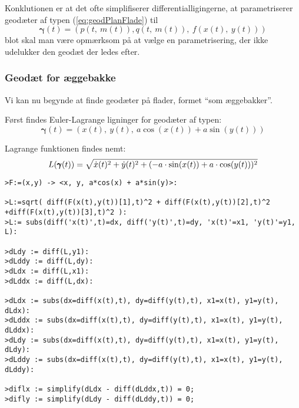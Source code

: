 Konklutionen er at det ofte simplifiserer differentialligingerne,
at parametriserer geodæter af typen (\ref{eq:geodPlanFlade}) til
\begin{equation*}
\pmb{\gamma}(t) = (p(t,~m(t)),q(t,~m(t)),~f(x(t),~y(t)))
\end{equation*}
blot skal man være opmærksom på at vælge en parametrisering, der ikke udelukker den geodæt der ledes efter.

\subsubsection{Geodæt for æggebakke }

Vi kan nu begynde at finde geodæter på flader, formet ``som æggebakker''.

Først findes Euler-Lagrange ligninger for geodæter af typen:
\begin{equation}\label{eq:aeggegeo}
\pmb{\gamma}(t) = (x(t),~y(t),~a\cos(x(t)) + a\sin(y(t)))
\end{equation}

Lagrange funktionen findes nemt:
\begin{equation*}
L(\pmb{\gamma}(t)) = \sqrt{\dot{x}(t)^2 + \dot{y}(t)^2 + ( -a \cdot \sin(x(t)) + a \cdot \cos(y(t)) )^2}
\end{equation*}
 
\begin{lstlisting}[caption=Udregning af de to Lagrange ligninger til (\ref{eq:aeggegeo}) med \emph{Maple}  ]
>F:=(x,y) -> <x, y, a*cos(x) + a*sin(y)>:

>L:=sqrt( diff(F(x(t),y(t))[1],t)^2 + diff(F(x(t),y(t))[2],t)^2 +diff(F(x(t),y(t))[3],t)^2 ):
>L:= subs(diff('x(t)',t)=dx, diff('y(t)',t)=dy, 'x(t)'=x1, 'y(t)'=y1, L):

>dLdy := diff(L,y1):
>dLddy := diff(L,dy):
>dLdx := diff(L,x1):
>dLddx := diff(L,dx):

>dLdx := subs(dx=diff(x(t),t), dy=diff(y(t),t), x1=x(t), y1=y(t), dLdx):
>dLddx := subs(dx=diff(x(t),t), dy=diff(y(t),t), x1=x(t), y1=y(t), dLddx):
>dLdy := subs(dx=diff(x(t),t), dy=diff(y(t),t), x1=x(t), y1=y(t), dLdy):
>dLddy := subs(dx=diff(x(t),t), dy=diff(y(t),t), x1=x(t), y1=y(t), dLddy):

>diflx := simplify(dLdx - diff(dLddx,t)) = 0;
>difly := simplify(dLdy - diff(dLddy,t)) = 0;
\end{lstlisting}

